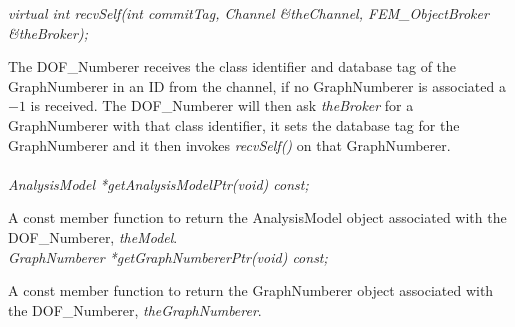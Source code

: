 {\em virtual int recvSelf(int commitTag, Channel \&theChannel, FEM\_ObjectBroker \&theBroker);}

The DOF\_Numberer receives the class identifier and database tag of
the GraphNumberer in an ID from the channel, if no GraphNumberer is
associated a $-1$ is received. The DOF\_Numberer will then ask {\em
theBroker} for a GraphNumberer with that class identifier, it sets the
database tag for the GraphNumberer and it then invokes {\em
recvSelf()} on that GraphNumberer. \\  

  \\
{\em AnalysisModel *getAnalysisModelPtr(void) const;} 

A const member function to return the AnalysisModel object associated with
the DOF\_Numberer, {\em theModel}. \\

{\em GraphNumberer *getGraphNumbererPtr(void) const;} 

A const member function to return the GraphNumberer object associated with
the DOF\_Numberer, {\em theGraphNumberer}. \\







